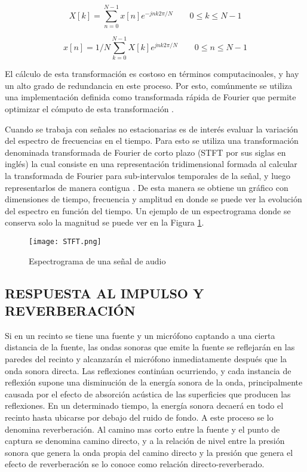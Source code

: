 \begin{equation}
\label{eqn:furier1}
	X[k] = \sum_{n=0}^{N-1} x[n]e^{-jnk2\pi/N} \qquad  0\leq k \leq N-1
\end{equation} 

\begin{equation}
\label{eqn:furier2}
	x[n] = {1}/{N}\sum_{k=0}^{N-1} X[k]e^{jnk2\pi/N} \qquad  0\leq n \leq N-1
\end{equation} 

El cálculo de esta transformación es costoso en términos computacinoales, y hay un alto grado de redundancia en este proceso. Por esto, comúnmente se utiliza una implementación definida como transformada rápida de Fourier que permite optimizar el cómputo de esta transformación \cite{fft}. 

Cuando se trabaja con señales no estacionarias es de interés evaluar la variación del espectro de frecuencias en el tiempo. Para esto se utiliza una transformación denominada transformada de Fourier de corto plazo (STFT por sus siglas en inglés) la cual consiste en una representación tridimensional formada al calcular la transformada de Fourier para sub-intervalos temporales de la señal, y luego representarlos de manera contigua \cite{ritmo}. De esta manera se obtiene un gráfico con dimensiones de tiempo, frecuencia y amplitud en donde se puede ver la evolución del espectro en función del tiempo. Un ejemplo de un espectrograma donde se conserva solo la magnitud se puede ver en la Figura \ref{fig:STFT}. 
 
 \begin{figure}[H]
  \centering{}
  \texttt{[image: STFT.png]}
  \caption{Espectrograma de una señal de audio}
  \label{fig:STFT}
\end{figure}


\subsection[Respuesta al impulso y reverberación]{RESPUESTA AL IMPULSO Y REVERBERACIÓN}

Si en un recinto se tiene una fuente y un micrófono captando a una cierta distancia de la fuente, las ondas sonoras que emite la fuente se reflejarán en las paredes del recinto y alcanzarán el micrófono inmediatamente después que la onda sonora directa. Las reflexiones continúan ocurriendo, y cada instancia de reflexión supone una disminución de la energía sonora de la onda, principalmente causada por el efecto de absorción acústica de las superficies que producen las reflexiones. En un determinado tiempo, la energía sonora decaerá en todo el recinto hasta ubicarse por debajo del ruido de fondo. A este proceso se lo denomina reverberación. Al camino mas corto entre la fuente y el punto de captura se denomina camino directo, y a la relación de nivel entre la presión sonora que genera la onda propia del camino directo y la presión que genera el efecto de reverberación se lo conoce como relación directo-reverberado. 

